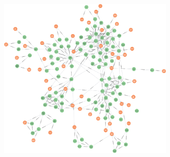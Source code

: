 \begin{figure}[H]
    \vspace{1em}
    \centering
    \setlength{\abovecaptionskip}{10pt} %
    \includegraphics[height=8cm]{../assets/Neo4j工具图1126-150nodes.png}
    \label{fig:ch3-neo4j}
\end{figure}





